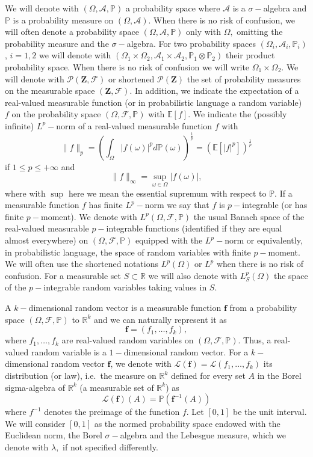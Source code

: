 \documentclass[11pt]{article}
\def\R{\mathbb{R}}
\def\P{\mathbb{P}}
\def\E{\mathbb{E}}
\newcommand{\Space}{\mathbf{Z}}
\renewcommand{\P}{\mathbb{P}}
\begin{document}
We will denote with $(\Omega,\mathcal{A},\P)$ a probability space where $\mathcal{A}$ is a  $\sigma-$algebra and $\P$ is a probability measure on $(\Omega,\mathcal{A})$. When there is no risk of confusion, we will often denote a probability space $(\Omega,\mathcal{A},\P)$ only with $\Omega,$ omitting the probability measure and the $\sigma-$algebra. For two probability spaces $(\Omega_i, \mathcal{A}_i, \P_i)$, $i=1,2$ we will denote with $(\Omega_1\times \Omega_2,\mathcal{A}_1\times \mathcal{A}_2,\P_1\otimes\P_2)$ their product probability space. When there is no risk of confusion we will write $\Omega_1\times \Omega_2.$ We will denote with $\mathcal{P}(\Space,\mathcal{F})$ or shortened $\mathcal{P}(\Space)$ the set of probability measures on the measurable space $(\Space,\mathcal{F})$. In addition, we indicate the expectation of a real-valued measurable function (or in probabilistic language a random variable) $f$ on the probability space $(\Omega,\mathcal{F},\P)$ with $\E[f]$. We indicate the (possibly infinite) $L^p-$norm of a real-valued measurable function $f$ with  
$$
\|f\|_p=\left(\int_{\Omega}|f(\omega)|^pd\P(\omega)\right)^{\frac{1}{p}}=\left(\E[|f|^p]\right)^{\frac{1}{p}}
$$
if $1\leq p \leq +\infty$ and 
$$\|f\|_{\infty}=\sup_{\omega\in \Omega}|f(\omega)|,$$
where with $\sup$ here we mean the essential supremum with respect to $\P$.
If a measurable function $f$ has finite $L^p-$norm we say that $f$ is $p-$integrable (or has finite $p-$moment). We denote with $L^p(\Omega,\mathcal{F},\P)$ the usual Banach space of the real-valued measurable $p-$integrable functions (identified if they are equal almost everywhere) on $(\Omega,\mathcal{F},\P)$ equipped with the $L^p-$norm or equivalently, in probabilistic language, the space of random variables with finite $p-$moment. We will often use the shortened notations $L^p(\Omega)$ or $L^p$ when there is no risk of confusion. For a measurable set $S\subset \R$ we will also denote with $L_S^p(\Omega)$ the space of the $p-$integrable random variables taking values in $S$.

A $k-$dimensional random vector is a measurable function $\mathbf{f}$ from a probability space $(\Omega,\mathcal{F},\P)$ to $\R^k$ and we can naturally represent it as $$
\mathbf{f}=(f_1,\ldots,f_k)
,$$ where $f_1,\ldots,f_k$ are real-valued random variables on $(\Omega,\mathcal{F},\P)$. Thus, a real-valued random variable is a $1-$dimensional random vector. For a $k-$dimensional random vector $\mathbf{f}$, we denote with $\mathcal{L}(\mathbf{f})=\mathcal{L}(f_1,\ldots,f_k)$ its distribution (or law), i.e.\ the measure on $\R^k$ defined for every set $A$ in the Borel sigma-algebra of $\R^k$ (a measurable set of $\R^k$) as 
$$
\mathcal{L}(\mathbf{f})(A)=\P(\mathbf{f}^{-1}(A))
$$
 where $f^{-1}$ denotes the preimage of the function $f.$ 
\newline
Let $[0,1]$ be the unit interval. We will consider $[0,1]$ as the normed probability space endowed with the Euclidean norm, the Borel $\sigma-$algebra and the Lebesgue measure, which we denote with $\lambda,$ if not specified differently.
\end{document}
